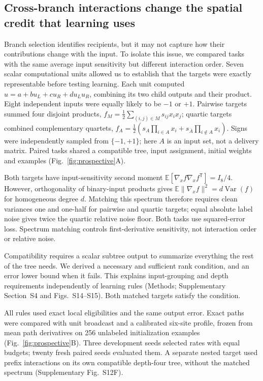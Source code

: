\documentclass[11pt]{article}
\newcommand{\E}{\mathbb{E}}
\begin{document}
\subsection*{Cross-branch interactions change the spatial credit that learning uses}

Branch selection identifies recipients, but it may not capture how their contributions change with the input. To isolate this issue, we compared tasks with the same average input sensitivity but different interaction order. Seven scalar computational units allowed us to establish that the targets were exactly representable before testing learning. Each unit computed $u=a+bu_L+cu_R+du_Lu_R$, combining its two child outputs and their product. Eight independent inputs were equally likely to be $-1$ or $+1$. Pairwise targets summed four disjoint products, $f_M=\frac12\sum_{(i,j)\in M}s_{ij}x_ix_j$; quartic targets combined complementary quartets, $f_A=\frac12(s_A\prod_{i\in A}x_i+s_{\bar A}\prod_{i\notin A}x_i)$. Signs were independently sampled from $\{-1,+1\}$; here $A$ is an input set, not a delivery matrix. Paired tasks shared a compatible tree, input assignment, initial weights and examples (Fig.~\ref{fig:prospective}A).

Both targets have input-sensitivity second moment $\E[\nabla_xf\nabla_xf^{\mathsf T}]=I_8/4$. However, orthogonality of binary-input products gives $\E\|\nabla_xf\|^2=d\operatorname{Var}(f)$ for homogeneous degree $d$. Matching this spectrum therefore requires clean variances one and one-half for pairwise and quartic targets; equal absolute label noise gives twice the quartic relative noise floor. Both tasks use squared-error loss. Spectrum matching controls first-derivative sensitivity, not interaction order or relative noise.

Compatibility requires a scalar subtree output to summarize everything the rest of the tree needs. We derived a necessary and sufficient rank condition, and an error lower bound when it fails. This explains input-grouping and depth requirements independently of learning rules (Methods; Supplementary Section~S4 and Figs.~S14--S15). Both matched targets satisfy the condition.

All rules used exact local eligibilities and the same output error. Exact paths were compared with unit broadcast and a calibrated six-site profile, frozen from mean path derivatives on 256 unlabeled initialization examples (Fig.~\ref{fig:prospective}B). Three development seeds selected rates with equal budgets; twenty fresh paired seeds evaluated them. A separate nested target used prefix interactions on its own compatible depth-four tree, without the matched spectrum (Supplementary Fig.~S12F).
\end{document}
